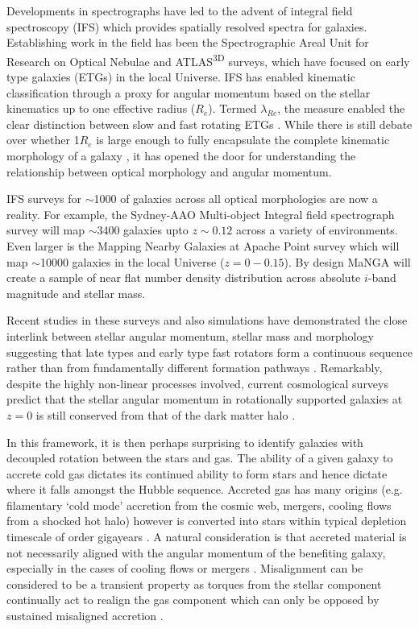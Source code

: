 \documentclass[fleqn,usenatbib]{mnras}
\begin{document}
Developments in spectrographs have led to the advent of integral field spectroscopy (IFS) which provides spatially resolved spectra for galaxies. Establishing work in the field has been the Spectrographic Areal Unit for Research on Optical Nebulae \citep[SAURON;][]{sauron} and ATLAS\textsuperscript{3D} \citep{atlas3d} surveys, which have focused on early type galaxies (ETGs) in the local Universe. IFS has enabled kinematic classification through a proxy for angular momentum based on the stellar kinematics up to one effective radius ($R_e$). Termed $\lambda_{Re}$, the measure enabled the clear distinction between slow and fast rotating ETGs \citep{emsellem2007, emsellem2011}. While there is still debate over whether 1$R_{e}$ is large enough to fully encapsulate the complete kinematic morphology of a galaxy \citep{foster2013,arnold2014}, it has opened the door for understanding the relationship between optical morphology and angular momentum. 

IFS surveys for $\sim$1000 of galaxies across all optical morphologies are now a reality. For example, the Sydney-AAO  Multi-object  Integral  field  spectrograph  survey \citep[][]{croom2012, bryant2015} will map $\sim$3400 galaxies upto $z\sim0.12$ across a variety of environments. Even larger is the Mapping Nearby Galaxies at Apache Point \citep[MaNGA;][]{bundy2015, blanton2017} survey which will map $\sim$10000 galaxies in the local Universe ($z=0-0.15$). By design MaNGA will create a sample of near flat number density distribution across absolute $i$-band magnitude and stellar mass.

Recent studies in these surveys and also simulations have demonstrated the close interlink between stellar angular momentum, stellar mass and morphology suggesting that late types and early type fast rotators form a continuous sequence rather than from fundamentally different formation pathways \citep[][]{cortese2016, lagos2017, graham2018}. Remarkably, despite the highly non-linear processes involved, current cosmological surveys predict that the stellar angular momentum in rotationally supported galaxies at $z=0$ is still conserved from that of the dark matter halo \citep[e.g.][]{genel2015}. 

In this framework, it is then perhaps surprising to identify galaxies with decoupled rotation between the stars and gas. The ability of a given galaxy to accrete cold gas dictates its continued ability to form stars and hence dictate where it falls amongst the Hubble sequence. Accreted gas has many origins (e.g. filamentary `cold mode' accretion from the cosmic web, mergers, cooling flows from a shocked hot halo) however is converted into stars within typical depletion timescale of order gigayears \citep{davis2016}. A natural consideration is that accreted material is not necessarily aligned with the angular momentum of the benefiting galaxy, especially in the cases of cooling flows or mergers \citep[e.g.][]{davis2011, lagos2015}. Misalignment can be considered to be a transient property as torques from the stellar component continually act to realign the gas component which can only be opposed by sustained misaligned accretion \citep[][]{vdvoort2015, davis2016}. 
\end{document}
